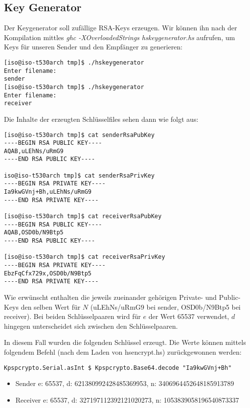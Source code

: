 \subsection{Key Generator}
Der Keygenerator soll zufällige RSA-Keys erzeugen. Wir können ihn nach der Kompilation mittles \emph{ghc -XOverloadedStrings hskeygenerator.hs} aufrufen, um Keys für unseren Sender und den Empfänger zu generieren:

\begin{lstlisting}
[iso@iso-t530arch tmp]$ ./hskeygenerator 
Enter filename:
sender
[iso@iso-t530arch tmp]$ ./hskeygenerator 
Enter filename:
receiver
\end{lstlisting}

Die Inhalte der erzeugten Schlüsselfiles sehen dann wie folgt aus:
\begin{lstlisting}
[iso@iso-t530arch tmp]$ cat senderRsaPubKey 
----BEGIN RSA PUBLIC KEY----
AQAB,uLEhNs/uRmG9
----END RSA PUBLIC KEY----

iso@iso-t530arch tmp]$ cat senderRsaPrivKey 
----BEGIN RSA PRIVATE KEY----
Ia9kwGVnj+Bh,uLEhNs/uRmG9
----END RSA PRIVATE KEY----

[iso@iso-t530arch tmp]$ cat receiverRsaPubKey 
----BEGIN RSA PUBLIC KEY----
AQAB,OSD0b/N9Btp5
----END RSA PUBLIC KEY----

[iso@iso-t530arch tmp]$ cat receiverRsaPrivKey 
----BEGIN RSA PRIVATE KEY----
EbzFqCfx729x,OSD0b/N9Btp5
----END RSA PRIVATE KEY----
\end{lstlisting}

Wie erwünscht enthalten die jeweils zueinander gehörigen Private- und Public-Keys den selben Wert für $N$ (\glqq{}uLEhNs/uRmG9\grqq{} bei sender, \glqq{}OSD0b/N9Btp5\grqq{} bei receiver). Bei beiden Schlüsselpaaren wird für $e$ der Wert 65537 verwendet, $d$ hingegen unterscheidet sich zwischen den Schlüsselpaaren.

In diesem Fall wurden die folgenden Schlüssel erzeugt. Die Werte können mittels folgendem Befehl (nach dem Laden von hsencrypt.hs) zurückgewonnen werden:
\begin{lstlisting}
Kpspcrypto.Serial.asInt $ Kpspcrypto.Base64.decode "Ia9kwGVnj+Bh"
\end{lstlisting}

\begin{itemize}
	\item Sender e: 65537, d: 621380992428485369953, n: 3406964452648185913789
	\item Receiver e: 65537, d: 327197112392121020273, n: 1053839058196540873337
\end{itemize}


